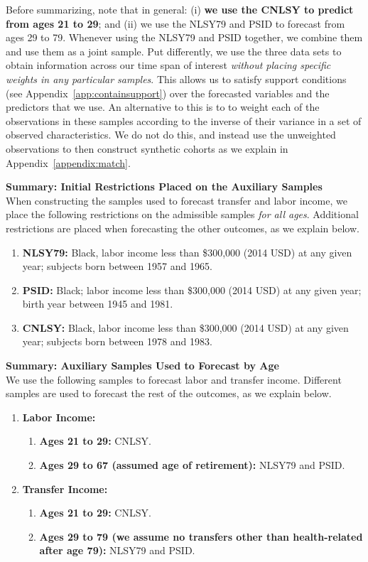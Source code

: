 \noindent Before summarizing, note that in general: (i) \textbf{we use the CNLSY to predict from ages 21 to 29}; and (ii) we use the NLSY79 and PSID to forecast from ages 29 to 79. Whenever using the NLSY79 and PSID together, we combine them and use them as a joint sample. Put differently, we use the three data sets to obtain information across our time span of interest \textit{without placing specific weights in any particular samples}. This allows us to satisfy support conditions (see Appendix~\ref{app:containsupport}) over the forecasted variables and the predictors that we use. An alternative to this is to to weight each of the observations in these samples according to the inverse of their variance in a set of observed characteristics. We do not do this, and instead use the unweighted observations to then construct synthetic cohorts as we explain in Appendix~\ref{appendix:match}.

\noindent \textbf{Summary: Initial Restrictions Placed on the Auxiliary Samples}\\
When constructing the samples used to forecast transfer and labor income, we place the following restrictions on the admissible samples \textit{for all ages}. Additional restrictions are placed when forecasting the other outcomes, as we explain below.
\begin{enumerate}
\item \textbf{NLSY79:} Black, labor income less than \$300,000 (2014 USD) at any given year; subjects born between 1957 and 1965.
\item \textbf{PSID:} Black;  labor income less than \$300,000 (2014 USD) at any given year; birth year between 1945 and 1981.
\item \textbf{CNLSY:} Black, labor income less than \$300,000 (2014 USD) at any given year; subjects born between 1978 and 1983.
\end{enumerate}

\noindent \textbf{Summary: Auxiliary Samples Used to Forecast by Age}\\
We use the following samples to forecast labor and transfer income. Different samples are used to forecast the rest of the outcomes, as we explain below.
\begin{enumerate}
\item \textbf{Labor Income:}
\begin{enumerate}
\item \textbf{Ages 21 to 29:} CNLSY.
\item \textbf{Ages 29 to 67 (assumed age of retirement):} NLSY79 and PSID.
\end{enumerate}
\item \textbf{Transfer Income:}
\begin{enumerate}
\item \textbf{Ages 21 to 29:} CNLSY.
\item \textbf{Ages 29 to 79 (we assume no transfers other than health-related after age 79):} NLSY79 and PSID.
\end{enumerate}
\end{enumerate}

